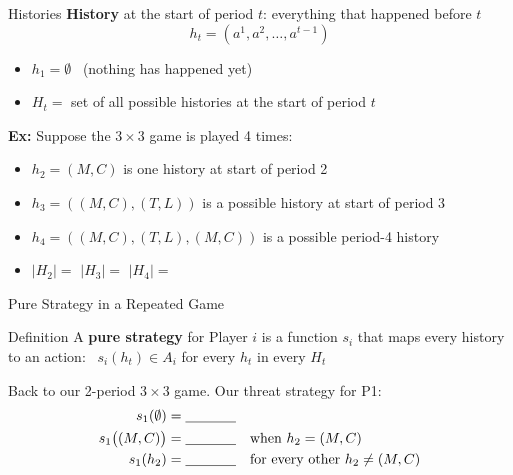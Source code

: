 \begin{frame}{Histories}
\textbf{History} at the start of period $t$: everything that happened before $t$
$$h_t=(a^1,a^2,\dots,a^{t-1})$$
\vspace{-0.15in}
\begin{itemize}
    \item $h_1=\emptyset$ \ (nothing has happened yet)
    \item $H_t=$ set of all possible histories at the start of period $t$
\end{itemize}
\bsk
\textbf{Ex:} Suppose the $3\times 3$ game is played 4 times:
\begin{itemize}
    \item $h_2=(M,C)$ is one history at start of period 2
    \item $h_3=((M,C),(T,L))$ is a possible history at start of period 3
    \item $h_4=((M,C),(T,L),(M,C))$ is a possible period-4 history
    \item $|H_2|=$ \underline{\hspace{0.4in}} \qquad $|H_3|=$ \underline{\hspace{0.8in}} \qquad $|H_4|=$ \underline{\hspace{1in}}
\end{itemize}
\bsk
{}
\vspace{-0.3in}
\end{frame}

\begin{frame}{Pure Strategy in a Repeated Game}
\begin{block}{Definition}
A \textbf{pure strategy} for Player $i$ is a function $s_i$ that maps every history to an action: \ $s_i(h_t)\in A_i$ for every $h_t$ in every $H_t$
\end{block}
\bsk
Back to our 2-period $3\times 3$ game. Our threat strategy for P1:
\begin{align*}
s_1(\emptyset)&=\underline{\hspace{0.5in}}\\
s_1\big((M,C)\big)&=\underline{\hspace{0.5in}} \quad \text{when } h_2=(M,C)\\
s_1(h_2)&=\underline{\hspace{0.5in}} \quad \text{for every other } h_2\neq (M,C)
\end{align*}
\bsk
{}
\vspace{-0.3in}
\end{frame}

